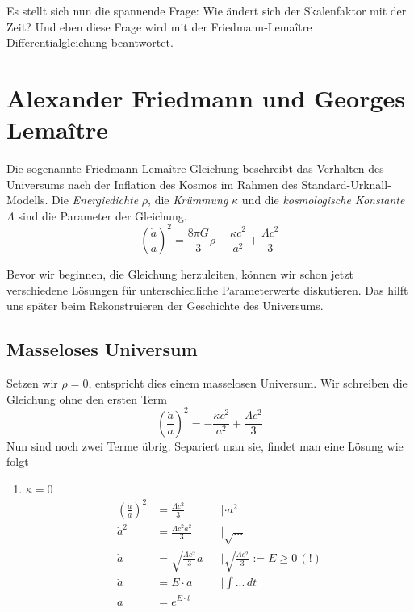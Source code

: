 \begin{refsection}
Es stellt sich nun die spannende Frage: Wie ändert sich der Skalenfaktor mit der Zeit? Und eben diese Frage wird mit der Friedmann-Lema\^{i}tre Differentialgleichung beantwortet.

\section{Alexander Friedmann und Georges Lema\^{i}tre}
Die sogenannte Friedmann-Lema\^{i}tre-Gleichung beschreibt das Verhalten des Universums nach der Inflation des Kosmos im Rahmen des Standard-Urknall-Modells. Die {\em Energiedichte} $\rho$, die {\em Krümmung} $\kappa$ und die {\em kosmologische Konstante} $\Lambda$ sind die Parameter der Gleichung.
\begin{equation}
\left(\frac{\dot{a}}{a}\right) ^2 = \frac{8 \pi G}{3} \rho - \frac{\kappa c^2}{a^2} + \frac{\Lambda c^2}{3}
\end{equation}

Bevor wir beginnen, die Gleichung herzuleiten, können wir schon jetzt verschiedene Lösungen für unterschiedliche Parameterwerte diskutieren. Das hilft uns später beim Rekonstruieren der Geschichte des Universums.

\subsection{Masseloses Universum \label{friedmann:masselosesUniversum}}
Setzen wir $\rho = 0$, entspricht dies einem masselosen Universum.  Wir schreiben die Gleichung ohne den ersten Term
\[\left(\frac{\dot{a}}{a}\right) ^2 = - \frac{\kappa c^2}{a^2} + \frac{\Lambda c^2}{3}\]
Nun sind noch zwei Terme übrig. Separiert man sie, findet man eine Lösung wie folgt
\begin{enumerate}
	\item $\kappa = 0$ 
		\begin{align}
			\nonumber \left(\frac{\dot{a}}{a}\right) ^2 &= \frac{\Lambda c^2}{3}  &&| \cdot a^2 \\
			\nonumber \dot{a} ^2 &= \frac{\Lambda c^2 a^2}{3}  &&|\sqrt{...}\\
			\nonumber \dot{a} &= \sqrt{\frac{\Lambda c^2}{3}} a &&|\sqrt{\frac{\Lambda c^2}{3}} := E \ge 0 \, (!)\\
			\nonumber \dot{a} &= E \cdot a &&|\int ...\, dt \\
			a &= e^{E \cdot t} \label{friedmann:Lambda}
		\end{align}
	

\end{enumerate}
\end{refsection}
